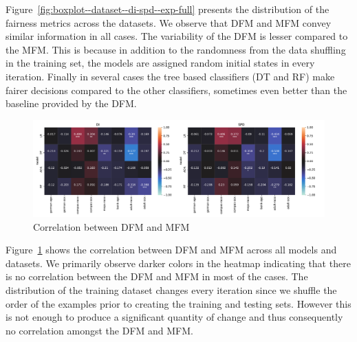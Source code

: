 \documentclass{article}
\begin{document}
Figure \ref{fig:boxplot--dataset--di-spd--exp-full} presents the
distribution of the fairness metrics across the datasets. We observe
that DFM and MFM convey similar information in all cases. The
variability of the DFM is lesser compared to the MFM. This is because
in addition to the randomness from the data shuffling in the training
set, the models are assigned random initial states in every iteration.
Finally in several cases the tree based classifiers (DT and RF) make
fairer decisions compared to the other classifiers, sometimes even
better than the baseline provided by the DFM.



\begin{figure}
  \centering
  \includegraphics[width=0.95\linewidth]{heatmap--corr--full-data.pdf}
  \caption{Correlation between DFM and MFM}
  \label{fig:heatmap--corr--full-data}
\end{figure}

Figure \ref{fig:heatmap--corr--full-data} shows the correlation
between DFM and MFM across all models and datasets. We primarily
observe darker colors in the heatmap indicating that there is no
correlation between the DFM and MFM in most of the cases. The
distribution of the training dataset changes every iteration since we
shuffle the order of the examples prior to creating the training and
testing sets. However this is not enough to produce a significant
quantity of change and thus consequently no correlation amongst the
DFM and MFM.
\end{document}
